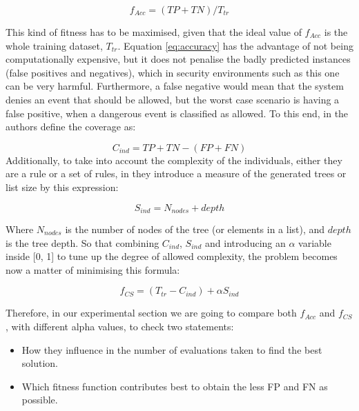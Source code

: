 \documentclass[runningheads]{llncs}
\begin{document}
\begin{equation}
\label{eq:accuracy}
f_{Acc} = (TP + TN) / T_{tr}
\end{equation}

This kind of fitness has to be maximised, given that the ideal value
of $f_{Acc}$ is the whole training dataset, $T_{tr}$. Equation \ref{eq:accuracy} has the 
advantage of not being computationally expensive, but it does not
penalise the badly predicted instances (false positives and
negatives), which in security environments such as this one can be
very harmful. Furthermore, a false negative would mean that the system denies an event that should be allowed, but the worst case scenario is having a false positive, when a dangerous event is classified as allowed.
To this end, in \cite{witten2005data} the authors define the coverage as:

\begin{equation}
\label{eq:coverage}
C_{ind} = TP + TN - (FP + FN)
\end{equation}
Additionally, to take into account the complexity of the individuals,
either they are a rule or a set of rules, in \cite{witten2005data}
they introduce a measure of the generated trees or list size by this
expression: 

\begin{equation}
S_{ind} = N_{nodes} + depth
\end{equation}

Where $N_{nodes}$ is the number of nodes of the tree (or elements in a list), and $depth$ is the tree depth. So that combining $C_{ind}$, $S_{ind}$ and introducing an $\alpha$ variable inside [0, 1] to tune up the degree of allowed complexity, the problem becomes now a matter of minimising this formula:

\begin{equation}
\label{eq:complexFitness}
f_{CS} = (T_{tr} - C_{ind}) + \alpha S_{ind}
\end{equation}

Therefore, in our experimental section we are going to compare both
$f_{Acc}$ and $f_{CS}$, with different  alpha values, to check two statements:

\begin{itemize}
	\item How they influence in the number of evaluations taken to find the best solution.
	\item Which fitness function contributes best to obtain the less FP and FN as possible.
\end{itemize}
\end{document}
